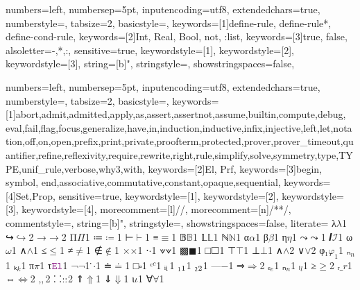 {
  numbers=left,
  numbersep=5pt,
  inputencoding=utf8,
  extendedchars=true,
  numberstyle=\footnotesize,
  tabsize=2,
  basicstyle={\ttfamily\scriptsize\upshape},
  keywords=[1]{define-rule, define-rule*, define-cond-rule},
  keywords=[2]{Int, Real, Bool, not, :list},
  keywords=[3]{true, false},
  alsoletter={-,*,:},
  sensitive=true,
  keywordstyle={[1]\color{mylpurple}},
  keywordstyle={[2]\color{RoyalBlue}},
  keywordstyle={[3]\color{mypurple}},
  string=[b]{"},
  stringstyle=\color{RedOrange},
  showstringspaces=false,
}

\newcommand{\sub}[1]{\ensuremath{_{\!#1}}}


{
  numbers=left,
  numbersep=5pt,
  inputencoding=utf8,
  extendedchars=true,
  numberstyle=\footnotesize,
  tabsize=2,
  basicstyle={\ttfamily\scriptsize\upshape},
  keywords=[1]{abort,admit,admitted,apply,as,assert,assertnot,assume,builtin,compute,debug, eval,fail,flag,focus,generalize,have,in,induction,inductive,infix,injective,left,let,notation,off,on,open,prefix,print,private,proofterm,protected,prover,prover_timeout,quantifier,refine,reflexivity,require,rewrite,right,rule,simplify,solve,symmetry,type,TYPE,unif_rule,verbose,why3,with},
  keywords=[2]{El, Prf},
  keywords=[3]{begin, symbol, end,associative,commutative,constant,opaque,sequential},
  keywords=[4]{Set,Prop},
  sensitive=true,
  keywordstyle={[1]\bfseries\color{purple}},
  keywordstyle={[2]\bfseries\color{mylpurple}},
  keywordstyle={[3]\bfseries\color{mylpurple}},
  keywordstyle={[4]\bfseries\color{RoyalBlue}},
  morecomment=[l]{//},
  morecomment=[n]{/*}{*/},
  commentstyle={\itshape\color{teal}},
  string=[b]{"},
  stringstyle=\color{RedOrange},
  showstringspaces=false,
  literate=
  {λ}{$\lambda$}1
  {↪}{$\hookrightarrow$}2
  {→}{$\rightarrow$}2
  {Π}{$\Pi$}1
  {≔}{$\coloneqq$}1
  {⊢}{$\vdash$}1
  {≡}{$\equiv$}1
  {𝔹}{$\mathbb{B}$}1
  {𝕃}{$\mathbb{L}$}1
  {ℕ}{$\mathbb{N}$}1
  {α}{$\alpha$}1
  {β}{$\beta$}1
  {η}{$\eta$}1
  {⤳}{$\rightcurvedarrow$}1
  {𝑰}{$\mathcal{I}$}1
  {ω}{$\omega$}1
  {∧}{$\wedge$}1
  {≤}{$\le$}1
  {≠}{$\neq$}1
  {∉}{$\notin$}1
  {×}{$\times$}1
  {⋅}{$\cdot$}1
  {⟇}{$\veedot$}1
  {▩}{$\blacksquare$}1
  {□}{$\Square$}1
  {⊤}{$\top$}1
  {⊥}{$\bot$}1
  {∧}{$\land$}2
  {∨}{$\lor$}2
  {φ₁}{$\varphi_1$}1
  {ₙ}{$_n$}1
  {ₖ}{$_k$}1
  {π}{$\pi$}1
  {τ}{$\el$}1
  {¬}{$\neg$}1
  { ̇}{$\cdot$}1
  {≐}{$\doteq$}1
  {□}{$\square$}1
  {ᶜ}{${^c}$}1
  {ᵢ}{$\textsubscript{i}$}1
  {₁}{$\textsubscript{1}$}1
  {₂}{$\textsubscript{2}$}1
  {—}{$-$}1
  {⇒}{$\Rightarrow$}2
  {ₑ}{${_e}$}1
  {ₙ}{${_n}$}1
  {ₗ}{${_l}$}1
  {≥}{$\geq$}2
  {ᵣ}{$\_r$}1
  {⇔}{$\Leftrightarrow$}2
  {‚}{$,$}2
  {⸬}{$\mathbin{::}$}2
  {⇑}{$\Uparrow$}1
  {⇓}{$\Downarrow$}1
  {ι}{$\iota$}1
  {∀}{$\forall$}1
}


\newcommand\smtinline[1]{\lstinline[language=SMT,basicstyle=\ttfamily\normalsize]|#1|}
\newcommand\rareinline[1]{\lstinline[language=RARE,basicstyle=\ttfamily\normalsize]|#1|}
\newcommand\lpinline[1]{\lstinline[language=Lambdapi,basicstyle=\ttfamily\normalsize]|#1|}